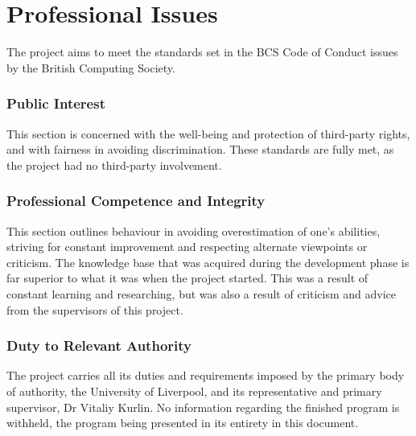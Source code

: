 \chapter{Professional Issues}
\label{ch:professional-issues}
The project aims to meet the standards set in the BCS Code of Conduct issues by the British Computing Society. 
\subsection*{Public Interest}
This section is concerned with the well-being and protection of third-party rights, and with fairness in avoiding discrimination. These standards are fully met, as the project had no third-party involvement.
\subsection*{Professional Competence and Integrity}
This section outlines behaviour in avoiding overestimation of one's abilities, striving for constant improvement and respecting alternate viewpoints or criticism. The knowledge base that was acquired during the development phase is far superior to what it was when the project started. This was a result of constant learning and researching, but was also a result of criticism and advice from the supervisors of this project.
\subsection*{Duty to Relevant Authority}
The project carries all its duties and requirements imposed by the primary body of authority, the University of Liverpool, and its representative and primary supervisor, Dr Vitaliy Kurlin. No information regarding the finished program is withheld, the program being presented in its entirety in this document.
